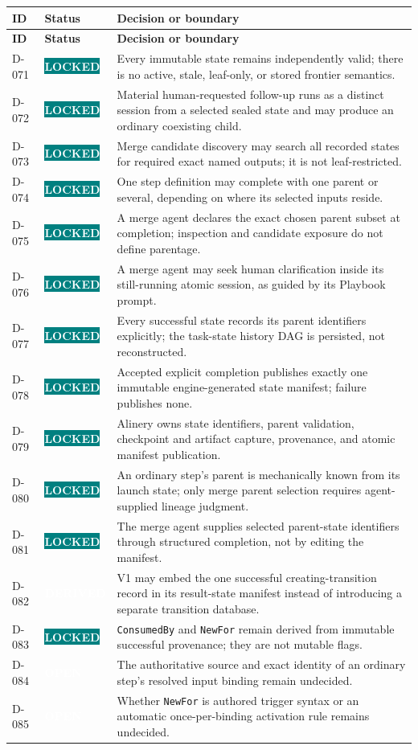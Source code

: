 \documentclass[11pt]{article}
\newcommand{\statuspill}[2]{%
  \begingroup\setlength{\fboxsep}{3pt}%
  \colorbox{#1}{\textcolor{white}{\sffamily\bfseries\scriptsize #2}}%
  \endgroup}
\newcommand{\Locked}{\statuspill{Teal}{LOCKED}}
\newcommand{\Derived}{\statuspill{Accent}{DERIVED}}
\newcommand{\Open}{\statuspill{Amber}{OPEN}}
\newcommand{\artifact}[1]{\texttt{#1}}
\begin{document}
\begin{longtable}{@{}L{0.52in}L{0.88in}L{5.10in}@{}}
\toprule
\textbf{ID} & \textbf{Status} & \textbf{Decision or boundary} \\
\midrule
\endfirsthead
\toprule
\textbf{ID} & \textbf{Status} & \textbf{Decision or boundary} \\
\midrule
\endhead
D-071 & \Locked & Every immutable state remains independently valid; there is no active, stale, leaf-only, or stored frontier semantics. \\
D-072 & \Locked & Material human-requested follow-up runs as a distinct session from a selected sealed state and may produce an ordinary coexisting child. \\
D-073 & \Locked & Merge candidate discovery may search all recorded states for required exact named outputs; it is not leaf-restricted. \\
D-074 & \Locked & One step definition may complete with one parent or several, depending on where its selected inputs reside. \\
D-075 & \Locked & A merge agent declares the exact chosen parent subset at completion; inspection and candidate exposure do not define parentage. \\
D-076 & \Locked & A merge agent may seek human clarification inside its still-running atomic session, as guided by its Playbook prompt. \\
D-077 & \Locked & Every successful state records its parent identifiers explicitly; the task-state history DAG is persisted, not reconstructed. \\
D-078 & \Locked & Accepted explicit completion publishes exactly one immutable engine-generated state manifest; failure publishes none. \\
D-079 & \Locked & Alinery owns state identifiers, parent validation, checkpoint and artifact capture, provenance, and atomic manifest publication. \\
D-080 & \Locked & An ordinary step's parent is mechanically known from its launch state; only merge parent selection requires agent-supplied lineage judgment. \\
D-081 & \Locked & The merge agent supplies selected parent-state identifiers through structured completion, not by editing the manifest. \\
D-082 & \Derived & V1 may embed the one successful creating-transition record in its result-state manifest instead of introducing a separate transition database. \\
D-083 & \Locked & \artifact{ConsumedBy} and \artifact{NewFor} remain derived from immutable successful provenance; they are not mutable flags. \\
D-084 & \Open & The authoritative source and exact identity of an ordinary step's resolved input binding remain undecided. \\
D-085 & \Open & Whether \artifact{NewFor} is authored trigger syntax or an automatic once-per-binding activation rule remains undecided. \\
\bottomrule
\end{longtable}
\end{document}
